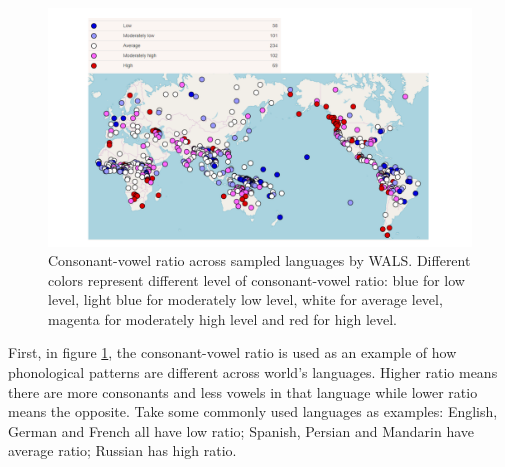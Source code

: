 \begin{figure}[h]
\centering
\captionsetup{justification=centering}
\includegraphics[width = 0.8\linewidth]{figures/WALS_example.pdf}
\caption{Consonant-vowel ratio across sampled languages by WALS. Different colors represent different level of consonant-vowel ratio: blue for low level, light blue for moderately low level, white for average level, magenta for moderately high level and red for high level.}
\label{fig:wals_example}
\end{figure}

First, in figure \ref{fig:wals_example}, the consonant-vowel ratio is used as an example of how phonological patterns are different across world's languages. Higher ratio means there are more consonants and less vowels in that language while lower ratio means the opposite. Take some commonly used languages as examples: English, German and French all have low ratio; Spanish, Persian and Mandarin have average ratio; Russian has high ratio.

